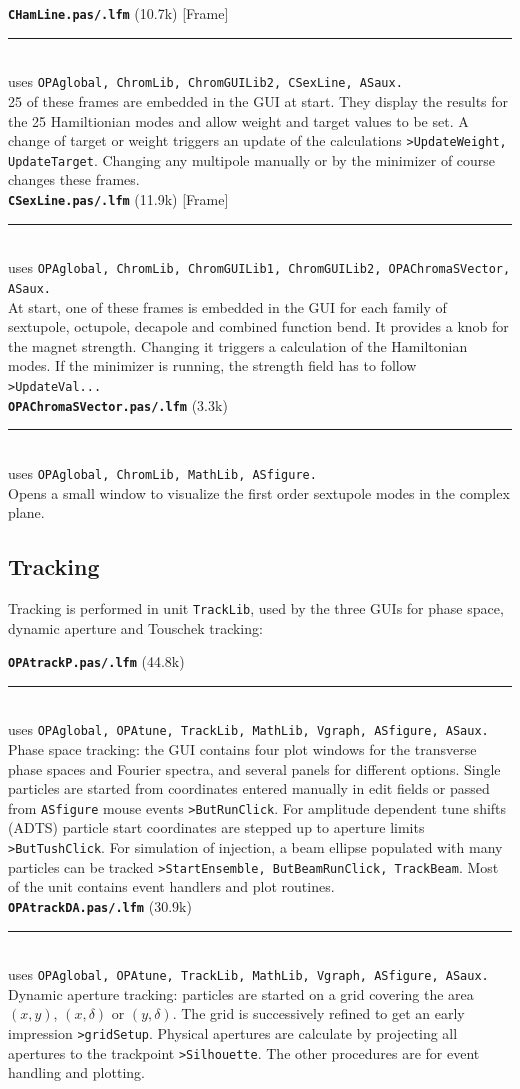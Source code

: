 \documentclass[12pt]{article}
\newcommand\code[1]{{\tt #1}}
\newcommand\opamodule[3]{{\bf \tt #1} #2\\  \rule[3pt]{\textwidth}{0.2pt} \\ {\scriptsize uses \tt  #3}\\[1ex]}
\begin{document}
\opamodule{CHamLine.pas/.lfm}{(10.7k) [Frame]}{OPAglobal, ChromLib, ChromGUILib2, CSexLine, ASaux.}
25 of these frames are embedded in the GUI at start. They display the results for the 25 Hamiltionian modes and allow weight and target values to be set. A change of target or weight triggers an update of the calculations \code{>UpdateWeight, UpdateTarget}. Changing any multipole manually or by the minimizer of course changes these frames.\\

\opamodule{CSexLine.pas/.lfm}{(11.9k) [Frame]}{OPAglobal, ChromLib, ChromGUILib1, ChromGUILib2, OPAChromaSVector, ASaux.}
At start, one of these frames is embedded in the GUI for each family of sextupole, octupole, decapole and combined function bend. It provides a knob for the magnet strength. Changing it triggers a calculation of the Hamiltonian modes. If the minimizer is running, the strength field has to follow \code{>UpdateVal...}\\

\opamodule{OPAChromaSVector.pas/.lfm}{(3.3k)}{OPAglobal, ChromLib, MathLib, ASfigure.}
Opens a small window to visualize the first order sextupole modes in the complex plane.


\subsection{Tracking}
Tracking is performed in unit {\tt TrackLib}, used by the three GUIs for phase space, dynamic aperture and Touschek tracking:

\opamodule{OPAtrackP.pas/.lfm}{(44.8k)}{OPAglobal,  OPAtune, TrackLib, MathLib, Vgraph, ASfigure, ASaux.}
Phase space tracking: the GUI contains four plot windows for the transverse phase spaces and Fourier spectra, and several panels for different options. Single particles are started from coordinates entered manually in edit fields or passed from {\tt ASfigure} mouse events \code{>ButRunClick}. For amplitude dependent tune shifts (ADTS) particle start coordinates are stepped up to aperture limits \code{>ButTushClick}. For simulation of injection, a beam ellipse populated with many particles can be tracked \code{>StartEnsemble, ButBeamRunClick, TrackBeam}. Most of the unit contains event handlers and plot routines.\\

\opamodule{OPAtrackDA.pas/.lfm}{(30.9k)}{OPAglobal,  OPAtune, TrackLib, MathLib, Vgraph, ASfigure, ASaux.}
Dynamic aperture tracking: particles are started on a grid covering the area $(x,y)$, $(x,\delta)$ or $(y,\delta)$. The grid is successively refined to get an early impression \code{>gridSetup}. Physical apertures are calculate by projecting all apertures to the trackpoint \code{>Silhouette}. The other procedures are for event handling and plotting.\\
\end{document}
